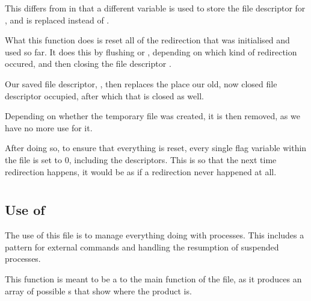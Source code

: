 \documentclass[12pt, a4paper]{report}
\begin{document}
                This differs from  in that a different variable is used 
                to store the file descriptor for , and  is 
                replaced instead of .

                \clearpage

                What this function does is reset all of the redirection that
                was initialised and used so far. It does this by flushing
                 or , depending on which kind of redirection
                occured, and then closing the file descriptor .

                Our saved file descriptor, , then replaces
                the place our old, now closed file descriptor occupied, after which
                that is closed as well.

                Depending on whether the temporary file was created, it is then
                removed, as we have no more use for it.

                After doing so, to ensure that everything is reset, every single
                flag variable within the file is set to 0, including the
                 descriptors. This is so that the next time
                redirection happens, it would be as if a redirection never happened
                at all.

                \clearpage

        \section{}
            \subsection{Use of }
                The use of this file is to manage everything doing
                with processes. This includes a  pattern
                for external commands and handling the resumption of
                suspended processes.
            
                This function is meant to be a  to the main 
                function of the file, as it produces an array of possible
                s that show where the product is.
\end{document}
